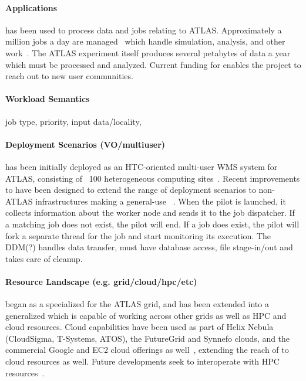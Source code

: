 \documentclass{sig-alternate}
\begin{document}
\paragraph{Applications}
\panda has been used to process data and jobs relating to ATLAS.  Approximately
a million jobs a day are managed~\cite{pandapresentation2013-06}
which handle simulation, analysis, and other work~\cite{maeno_pd2p:_2012}.
The ATLAS experiment itself produces several petabytes of data a year
which must be processed and analyzed.
Current funding for \panda enables the project to reach out to new user
communities.

\paragraph{Workload Semantics}
job type, priority, input data/locality,

\paragraph{Deployment Scenarios (VO/multiuser)}
\panda has been initially deployed as an HTC-oriented multi-user WMS system for
ATLAS, consisting of ~100 heterogeneous computing
sites~\cite{maeno_pd2p:_2012}.
Recent improvements to \panda have been designed to extend the range of
deployment scenarios to non-ATLAS infrastructures making \panda a general-use
\pilotjob~\cite{nilsson2012recent}.
When the pilot is launched, it collects information about the worker node and
sends it to the job dispatcher.
If a matching job does not exist, the pilot will end. If a job does exist, the
pilot will fork a separate thread for the job and start monitoring its
execution.
The DDM(?) handles data transfer, must have database access, file stage-in/out
and takes care of cleanup.

\paragraph{Resource Landscape (e.g. grid/cloud/hpc/etc)}
\panda began as a specialized \pilotjob for the ATLAS grid, and has been
extended into a generalized \pilotjob which is capable of working across other
grids as well as HPC and cloud resources.
Cloud capabilities have been used as part of Helix Nebula (CloudSigma,
T-Systems, ATOS), the FutureGrid and Synnefo clouds, and the commercial Google
and EC2 cloud offerings as well~\cite{pandapresentation2013-06}, extending the
reach of \panda to cloud resources as well.
Future \panda developments seek to interoperate with HPC
resources~\cite{pandapresentation2013-06}.
\end{document}

